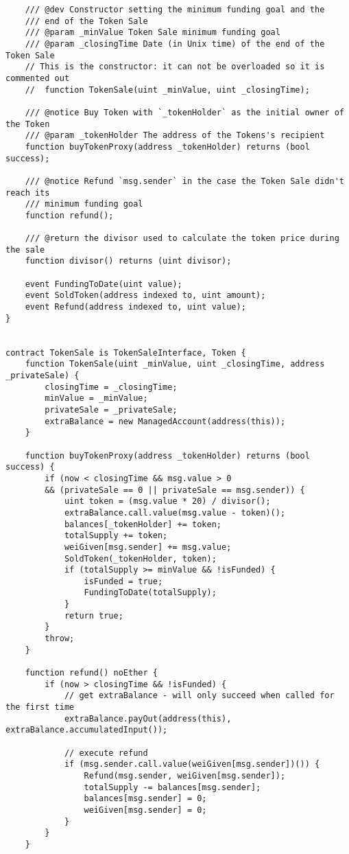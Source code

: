 \documentclass[9pt,oneside]{amsart}
\begin{document}
\begin{appendix}
\begin{verbatim}
    /// @dev Constructor setting the minimum funding goal and the 
    /// end of the Token Sale
    /// @param _minValue Token Sale minimum funding goal
    /// @param _closingTime Date (in Unix time) of the end of the Token Sale
    // This is the constructor: it can not be overloaded so it is commented out
    //  function TokenSale(uint _minValue, uint _closingTime);

    /// @notice Buy Token with `_tokenHolder` as the initial owner of the Token
    /// @param _tokenHolder The address of the Tokens's recipient 
    function buyTokenProxy(address _tokenHolder) returns (bool success);

    /// @notice Refund `msg.sender` in the case the Token Sale didn't reach its 
    /// minimum funding goal
    function refund();

    /// @return the divisor used to calculate the token price during the sale
    function divisor() returns (uint divisor);

    event FundingToDate(uint value);
    event SoldToken(address indexed to, uint amount);
    event Refund(address indexed to, uint value);
}


contract TokenSale is TokenSaleInterface, Token {
    function TokenSale(uint _minValue, uint _closingTime, address _privateSale) {
        closingTime = _closingTime;
        minValue = _minValue;
        privateSale = _privateSale;
        extraBalance = new ManagedAccount(address(this));
    }

    function buyTokenProxy(address _tokenHolder) returns (bool success) {
        if (now < closingTime && msg.value > 0 
        && (privateSale == 0 || privateSale == msg.sender)) {
            uint token = (msg.value * 20) / divisor();
            extraBalance.call.value(msg.value - token)();
            balances[_tokenHolder] += token;
            totalSupply += token;
            weiGiven[msg.sender] += msg.value;
            SoldToken(_tokenHolder, token);
            if (totalSupply >= minValue && !isFunded) {
                isFunded = true;
                FundingToDate(totalSupply);
            }
            return true;
        }
        throw;
    }

    function refund() noEther {
        if (now > closingTime && !isFunded) {
            // get extraBalance - will only succeed when called for the first time
            extraBalance.payOut(address(this), extraBalance.accumulatedInput());

            // execute refund
            if (msg.sender.call.value(weiGiven[msg.sender])()) {
                Refund(msg.sender, weiGiven[msg.sender]);
                totalSupply -= balances[msg.sender];
                balances[msg.sender] = 0;
                weiGiven[msg.sender] = 0;
            }
        }
    }


\end{verbatim}
\end{appendix}
\end{document}
